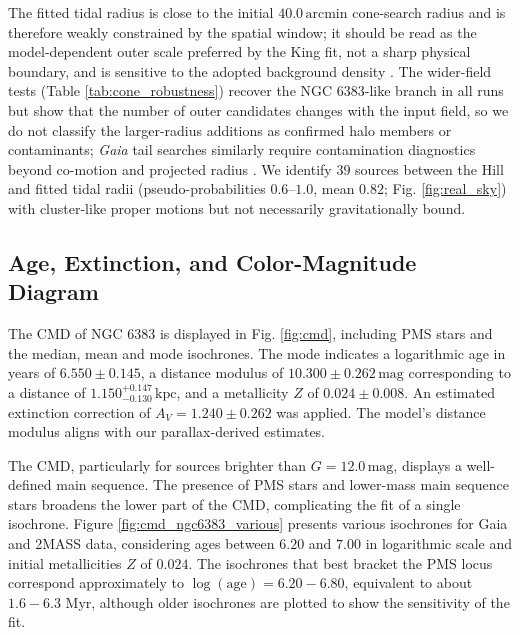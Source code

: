\documentclass{aa}
\begin{document}
The fitted tidal radius is close to the initial $40.0\,\mathrm{arcmin}$ cone-search radius and is therefore weakly constrained by the spatial window; it should be read as the model-dependent outer scale preferred by the King fit, not a sharp physical boundary, and is sensitive to the adopted background density \citep{2025MNRAS.539.2513A}. The wider-field tests (Table \ref{tab:cone_robustness}) recover the NGC 6383-like branch in all runs but show that the number of outer candidates changes with the input field, so we do not classify the larger-radius additions as confirmed halo members or contaminants; \textit{Gaia} tail searches similarly require contamination diagnostics beyond co-motion and projected radius \citep{2025A&A...694A.258R,2025A&A...698A.156X}. We identify $39$ sources between the Hill and fitted tidal radii (pseudo-probabilities $0.6$--$1.0$, mean $0.82$; Fig. \ref{fig:real_sky}) with cluster-like proper motions but not necessarily gravitationally bound.

\subsection{Age, Extinction, and Color-Magnitude Diagram}

The CMD of NGC 6383 is displayed in Fig. \ref{fig:cmd}, including PMS stars and the median, mean and mode isochrones. The mode indicates a logarithmic age in years of $6.550 \pm 0.145$, a distance modulus of $10.300\pm 0.262\,\mathrm{mag}$ corresponding to a distance of $1.150_{-0.130}^{+0.147}\,\mathrm{kpc}$, and a metallicity $Z $ of $0.024 \pm 0.008$. An estimated extinction correction of $A_V = 1.240 \pm 0.262$ was applied. The model’s distance modulus aligns with our parallax-derived estimates.

The CMD, particularly for sources brighter than $G=12.0\,\mathrm{mag}$, displays a well-defined main sequence. The presence of PMS stars and lower-mass main sequence stars broadens the lower part of the CMD, complicating the fit of a single isochrone. Figure \ref{fig:cmd_ngc6383_various} presents various isochrones for Gaia and 2MASS data, considering ages between $6.20$ and $7.00$ in logarithmic scale and initial metallicities $ Z $ of $0.024$. The isochrones that best bracket the PMS locus correspond approximately to $\log(\mathrm{age})=6.20-6.80$, equivalent to about $1.6-6.3$ Myr, although older isochrones are plotted to show the sensitivity of the fit.
\end{document}
